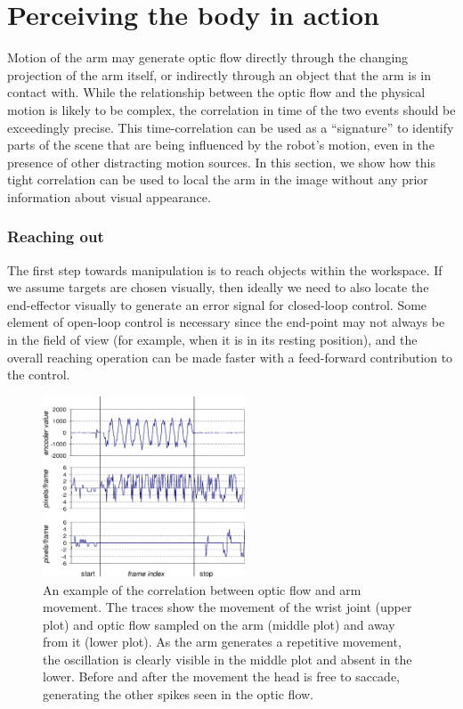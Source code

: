 
\section{Perceiving the body in action}

Motion of the arm may generate optic flow directly through the
changing projection of the arm itself, or indirectly through an object
that the arm is in contact with.  While the relationship between the
optic flow and the physical motion is likely to be complex,
the correlation in time of the two events should be
exceedingly precise.  This time-correlation can be used as a
``signature'' to identify parts of the scene that are being influenced
by the robot's motion, even in the presence of other distracting
motion sources.  In this section, we show how this tight correlation
can be used to local\ize{} the arm in the image without any prior
information about visual appearance.  

\subsubsection*{Reaching out}

The first step towards manipulation is to reach objects within the
workspace.  If we assume targets are chosen visually, then ideally we
need to also locate the end-effector visually to generate an error
signal for closed-loop control.  Some element of open-loop control is
necessary since the end-point may not always be in the field of view
(for example, when it is in its resting position), and the overall
reaching operation can be made faster with a feed-forward contribution
to the control.

\begin{figure}[tb]
\begin{center}
\includegraphics[width=6.0cm]{joint-correlation3.eps}
\caption{ 
\label{fig:joint-correlation}
%
An example of the correlation between optic flow and arm movement.
The traces show the movement of the wrist joint (upper plot)
and optic flow sampled on the arm (middle plot) and away from it (lower
plot).  As the arm generates a repetitive movement, the oscillation
is clearly visible in the middle plot and absent in the lower.
Before and after the movement the head is free to saccade, generating the
other spikes seen in the optic flow.
%
}
\end{center}
\end{figure}



